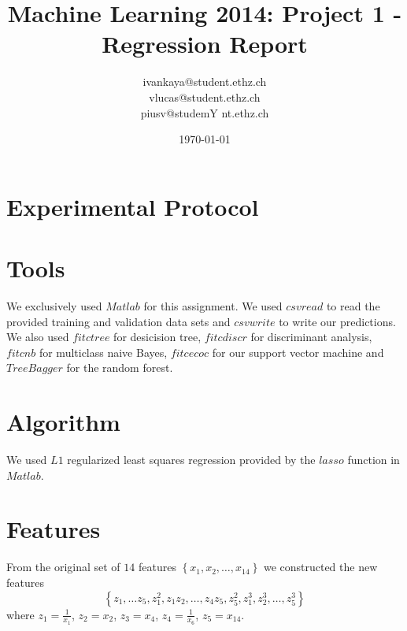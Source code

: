 \documentclass[a4paper, 11pt]{article}
\title{Machine Learning 2014: Project 1 - Regression Report}
\author{ivankaya@student.ethz.ch\\vlucas@student.ethz.ch\\ piusv@studemY nt.ethz.ch\\}
\date{\today}
\begin{document}
\maketitle

\section*{Experimental Protocol}

\section{Tools}

We exclusively used $Matlab$ for this assignment.
We used $csvread$ to read the provided training and validation data sets and
$csvwrite$ to write our predictions. We also used $fitctree$ for desicision tree, $fitcdiscr$ for discriminant analysis, $fitcnb$ for multiclass naive Bayes, $fitcecoc$ for our support vector machine and $TreeBagger$ for the random forest.


\section{Algorithm}
We used $L1$ regularized least squares regression provided by the $lasso$ function in $Matlab$.

\section{Features}

From the original set of $14$ features $\left\{x_1, x_2, \ldots, x_{14} \right\}$
we constructed the new features
\[
\left\{z_1, \ldots z_5, z_{1}^{2}, z_1z_2, \ldots, z_4z_5, z_{5}^{2}, z_{1}^{3}, z_{2}^{3}, \ldots, z_{5}^{3} \right\}
\]
where $z_1 = \frac{1}{x_1}$, $z_2 = x_2$, $z_3 = x_4$, $z_4 = \frac{1}{x_6}$, $z_5 = x_{14}$.
\end{document}
